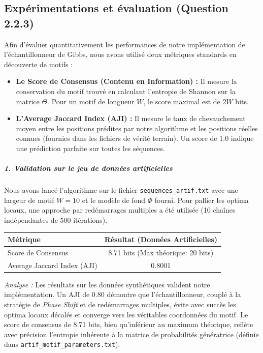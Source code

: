 \subsection{Expérimentations et évaluation (Question 2.2.3)}

Afin d'évaluer quantitativement les performances de notre implémentation de l'échantillonneur de Gibbs, nous avons utilisé deux métriques standards en découverte de motifs :
\begin{itemize}
    \item \textbf{Le Score de Consensus (Contenu en Information) :} Il mesure la conservation du motif trouvé en calculant l'entropie de Shannon sur la matrice $\Theta$. Pour un motif de longueur $W$, le score maximal est de $2W$ bits.
    \item \textbf{L'Average Jaccard Index (AJI) :} Il mesure le taux de chevauchement moyen entre les positions prédites par notre algorithme et les positions réelles connues (fournies dans les fichiers de vérité terrain). Un score de 1.0 indique une prédiction parfaite sur toutes les séquences.
\end{itemize}

\subparagraph{1. Validation sur le jeu de données artificielles}
Nous avons lancé l'algorithme sur le fichier \texttt{sequences\_artif.txt} avec une largeur de motif $W=10$ et le modèle de fond $\Phi$ fourni. Pour pallier les optima locaux, une approche par redémarrages multiples a été utilisée (10 chaînes indépendantes de $500$ itérations).

\begin{center}
\renewcommand{\arraystretch}{1.2}
\begin{tabular}{|l|c|}
    \hline
    \textbf{Métrique} & \textbf{Résultat (Données Artificielles)} \\
    \hline
    Score de Consensus & 8.71 bits (Max théorique: 20 bits) \\
    Average Jaccard Index (AJI) & 0.8001 \\
    \hline
\end{tabular}
\end{center}

\textit{Analyse :} Les résultats sur les données synthétiques valident notre implémentation. Un AJI de $0.80$ démontre que l'échantillonneur, couplé à la stratégie de \textit{Phase Shift} et de redémarrages multiples, évite avec succès les optima locaux décalés et converge vers les véritables coordonnées du motif. Le score de consensus de 8.71 bits, bien qu'inférieur au maximum théorique, reflète avec précision l'entropie inhérente à la matrice de probabilités génératrice (définie dans \texttt{artif\_motif\_parameters.txt}).

